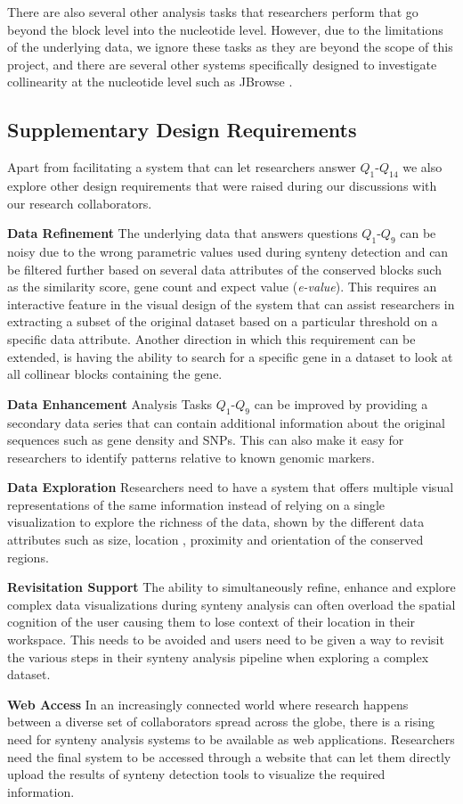 There are also several other analysis tasks that researchers perform that go beyond the block level into the nucleotide level. However, due to the limitations of the underlying data, we ignore these tasks as they are beyond the scope of this project, and there are several other systems specifically designed to investigate collinearity at the nucleotide level such as JBrowse \cite{skinner2009jbrowse}.


\subsection{Supplementary Design Requirements}
Apart from facilitating a system that can let researchers answer $Q_1$-$Q_{14}$ we also explore other design requirements that were raised during our discussions with our research collaborators. 

\textbf{Data Refinement} The underlying data that answers questions $Q_1$-$Q_9$ can be noisy due to the wrong parametric values used during synteny detection and can be filtered further based on several data attributes of the conserved blocks such as the similarity score, gene count and expect value (\textit{e-value}). This requires an interactive feature in the visual design of the system that can assist researchers in extracting a subset of the original dataset based on a particular threshold on a specific data attribute. Another direction in which this requirement can be extended, is having the ability to search for a specific gene in a dataset to look at all collinear blocks containing the gene.

\textbf{Data Enhancement} Analysis Tasks $Q_1$-$Q_9$ can be improved by providing a secondary data series that can contain additional information about the original sequences such as gene density and SNPs. This can also make it easy for researchers to identify patterns relative to known genomic markers.

\textbf{Data Exploration} Researchers need to have a system that offers multiple visual representations of the same information instead of relying on a single visualization to explore the richness of the data, shown by the different data attributes such as size, location , proximity and orientation of the conserved regions.

\textbf{Revisitation Support} The ability to simultaneously refine, enhance and explore complex data visualizations during synteny analysis can often overload the spatial cognition of the user causing them to lose context of their location in their workspace. This needs to be avoided and users need to be given a way to revisit the various steps in their synteny analysis pipeline when exploring a complex dataset.

\textbf{Web Access} In an increasingly connected world where research happens between a diverse set of collaborators spread across the globe, there is a rising need for synteny analysis systems to be available as web applications. Researchers need the final system to be accessed through a website that can let them directly upload the results of synteny detection tools to visualize the required information.




